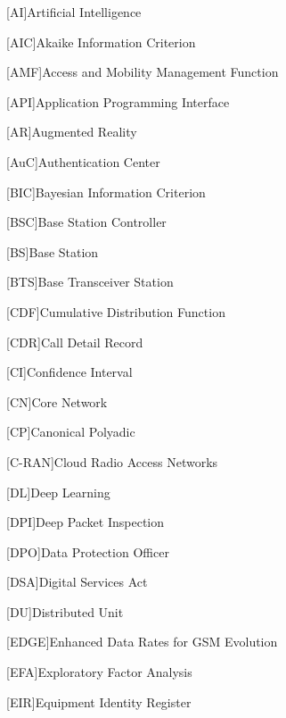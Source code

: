 \begin{acronym}[]

[AI]{Artificial Intelligence}

[AIC]{Akaike Information Criterion}

[AMF]{Access and Mobility Management Function}

[API]{Application Programming Interface}

[AR]{Augmented Reality}

[AuC]{Authentication Center}

[BIC]{Bayesian Information Criterion}

[BSC]{Base Station Controller}

[BS]{Base Station}

[BTS]{Base Transceiver Station}

[CDF]{Cumulative Distribution Function}

[CDR]{Call Detail Record}

[CI]{Confidence Interval}

[CN]{Core Network}

[CP]{Canonical Polyadic}

[C-RAN]{Cloud Radio Access Networks}

[DL]{Deep Learning}

[DPI]{Deep Packet Inspection}

[DPO]{Data Protection Officer}

[DSA]{Digital Services Act}

[DU]{Distributed Unit}

[EDGE]{Enhanced Data Rates for GSM Evolution}

[EFA]{Exploratory Factor Analysis}

[EIR]{Equipment Identity Register}


\end{acronym}
